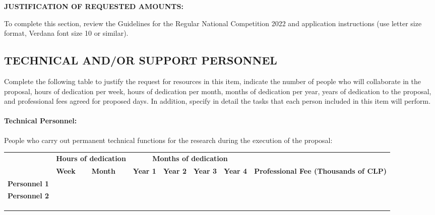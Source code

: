 \noindent\textbf{JUSTIFICATION OF REQUESTED AMOUNTS:}

\noindent To complete this section, review the Guidelines for the Regular National Competition 2022 and application instructions (use letter size format, Verdana font size 10 or similar).

\subsection*{\uppercase{Technical and/or support personnel}}

Complete the following table to justify the request for resources in this item, indicate the number of people who will collaborate in the proposal, hours of dedication per week, hours of dedication per month, months of dedication per year, years of dedication to the proposal, and professional fees agreed for proposed days.
In addition, specify in detail the tasks that each person included in this item will perform.

\paragraph*{Technical Personnel:} People who carry out permanent technical functions for the research during the execution of the proposal:

\medskip

\noindent\begin{tabularx}{\linewidth}{|m{.26\linewidth}|X|X|X|X|X|X|m{.20\linewidth}|}
\hline
\cellcolor{tcc}
& \multicolumn{2}{c|}{\cellcolor{tcc}\begin{minipage}{.14\linewidth}\centering\textbf{Hours of dedication}\vspace{3pt}\end{minipage}}
& \multicolumn{4}{c|}{\cellcolor{tcc}\textbf{Months of dedication}}
& \cellcolor{tcc}
\tabularnewline
\hhline{|>{\arrayrulecolor{tcc}}->{\arrayrulecolor{black}}|------>{\arrayrulecolor{tcc}}->{\arrayrulecolor{black}}}
\multirow{-2}{*}{\cellcolor{tcc}\textbf{Technical personnel}}
& \cellcolor{tcc}\centering\small\textbf{Week}
& \cellcolor{tcc}\centering\small\textbf{Month}
& \cellcolor{tcc}\centering\small\textbf{Year 1}
& \cellcolor{tcc}\centering\small\textbf{Year 2}
& \cellcolor{tcc}\centering\small\textbf{Year 3}
& \cellcolor{tcc}\centering\small\textbf{Year 4}
& \multirow{-2}{.20\textwidth}{\cellcolor{tcc}\centering\textbf{Professional Fee (Thousands of CLP)}}
\tabularnewline
\hline
\textbf{Personnel 1} & & & & & & & \\\hline
\textbf{Personnel 2} & & & & & & & \\\hline
 & & & & & & & \\\hline
 & & & & & & & \\\hline
 & & & & & & & \\\hline
\end{tabularx}

